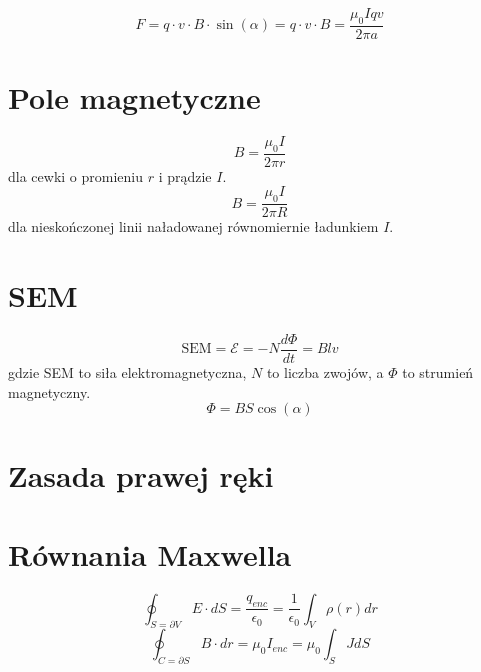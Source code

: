 \documentclass{../konspekt}
\begin{document}
\begin{multicols}{2}
  $$
  F = q \cdot v \cdot B \cdot \sin(\alpha) = q \cdot v \cdot B =
  \frac{\mu_0 I q v}{2\pi a}
  $$

  \section{Pole magnetyczne}

  $$
  B = \frac{\mu_0 I}{2\pi r}
  $$
  dla cewki o promieniu $r$ i prądzie $I$.
  $$
  B = \frac{\mu_0 I}{2\pi R}
  $$
  dla nieskończonej linii naładowanej równomiernie ładunkiem $I$.

  \section{SEM}

  $$
  \text{SEM} = \mathcal{E} = -N \frac{d \Phi}{dt} = Blv
  $$
  gdzie SEM to siła elektromagnetyczna, $N$ to liczba zwojów, a $\Phi$
  to strumień magnetyczny.
  $$
  \Phi = BS \cos(\alpha)
  $$

  \section{Zasada prawej ręki}

  \begin{center}
  \end{center}

  \section{Równania Maxwella}

  $$
  \oint_{S = \partial V} E \cdot dS = \frac{q_{enc}}{\epsilon_0} =
  \frac{1}{\epsilon_0} \int_V \rho(r) dr
  $$
  $$
  \oint_{C = \partial S} B \cdot dr = \mu_0 I_{enc} = \mu_0 \int_S J dS
  $$

\end{multicols}
\end{document}
